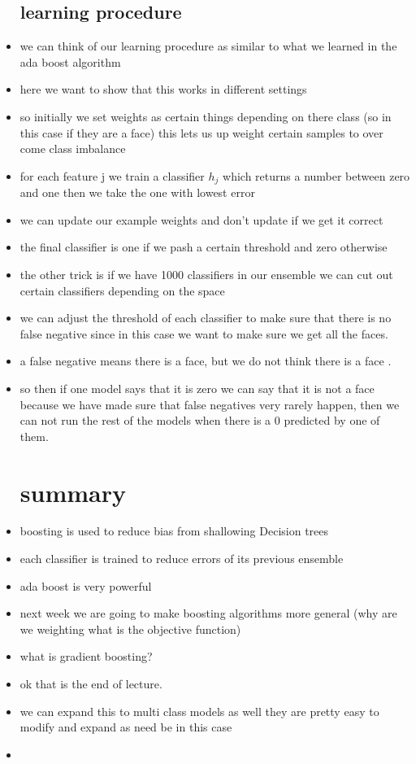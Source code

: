 \documentclass{article}
\begin{document}
\begin{itemize}
\subsection*{learning procedure}
\item we can think of our learning procedure as similar to what we learned in the ada boost algorithm
\item here we want to show that this works in different settings 
\item so initially we set weights as certain things depending on there class  (so in this case if they are a face) this lets us up weight certain samples to over come class imbalance
\item for each feature j we train a classifier $h_{j}$ which returns a number between zero and one then we take the one with lowest error
\item we can update our example weights and don't update if we get it correct 
\item the final classifier is one if we pash a certain threshold and zero otherwise 
\item the other trick is if we have 1000 classifiers in our ensemble we can cut out certain classifiers depending on the space
\item we can adjust the threshold of each classifier to make sure that there is no false negative since in this case we want to make sure we get all the faces. 
\item a false negative means there is a face, but we do not think there is a face .
\item so then if one model says that it is zero we can say that it is not a face because we have made sure that false negatives very rarely happen, then we can not run the rest of the models when there is a 0 predicted by one of them. 
\section*{summary}
\item boosting is used to reduce bias from shallowing Decision trees 
\item each classifier is trained to reduce errors of its previous ensemble 
\item ada boost is very powerful 
\item next week we are going to make boosting algorithms more general (why are we weighting what is the objective function)
\item what is gradient boosting?
\item ok that is the end of lecture. 
\item we can expand this to multi class models as well they are pretty easy to modify and expand as need be in this case 
\item 
\end{itemize}
\end{document}
